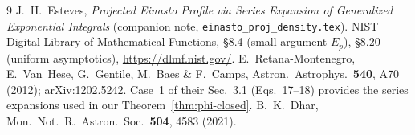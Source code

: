 \documentclass{article}
\begin{document}
\begin{thebibliography}{9}
J.~H.~Esteves, \emph{Projected Einasto Profile via Series Expansion of
Generalized Exponential Integrals} (companion note,
\texttt{einasto\_proj\_density.tex}).
NIST Digital Library of Mathematical Functions, \S8.4 (small-argument $E_p$),
\S8.20 (uniform asymptotics), \url{https://dlmf.nist.gov/}.
E.~Retana-Montenegro, E.~Van~Hese, G.~Gentile, M.~Baes \& F.~Camps,
Astron.\ Astrophys.\ \textbf{540}, A70 (2012); arXiv:1202.5242.
Case~1 of their Sec.~3.1 (Eqs.~17--18) provides the series expansions used
in our Theorem~\ref{thm:phi-closed}.
B.~K.~Dhar, Mon.\ Not.\ R.\ Astron.\ Soc.\ \textbf{504}, 4583 (2021).
\end{thebibliography}
\end{document}
